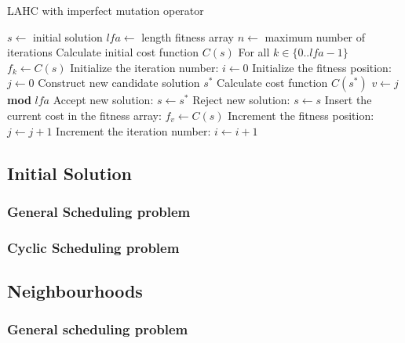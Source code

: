 \documentclass[]{article}
\begin{document}
\begin{algorithm}                      %
	\caption{LAHC with imperfect mutation operator}%
	\label{alg:lahc}                           %
	\begin{algorithmic}[1]                    %
		\REQUIRE $s \leftarrow$ initial solution
		\REQUIRE $lfa \leftarrow$ length fitness array
		\REQUIRE $n \leftarrow$ maximum number of iterations
		\STATE Calculate initial cost function $C(s)$
		\STATE For all $k \in \{0..lfa-1\}$ $f_k \leftarrow C(s)$
		\STATE Initialize the iteration number: $i \leftarrow 0$
		\STATE Initialize the fitness position: $j \leftarrow 0$
		\STATE Construct new candidate solution $s^*$
			\STATE Calculate cost function $C(s^*)$
			\STATE $v \leftarrow j$ \textbf{mod} $lfa$
				\STATE Accept new solution: $s \leftarrow s^*$
			\ELSE
				\STATE Reject new solution: $s \leftarrow s$
			\ENDIF
			\STATE Insert the current cost in the fitness array: $f_v \leftarrow C(s)$
			\STATE Increment the fitness position: $j \leftarrow j+1$
		\ENDIF
		\STATE Increment the iteration number: $i \leftarrow i+1$
		\ENDWHILE
	\end{algorithmic}
\end{algorithm}

\subsection{Initial Solution}
\subsubsection{General Scheduling problem}

\subsubsection{Cyclic Scheduling problem}

\subsection{Neighbourhoods}
\label{subsec:neighbourhoods}
\subsubsection{General scheduling problem}
\end{document}
